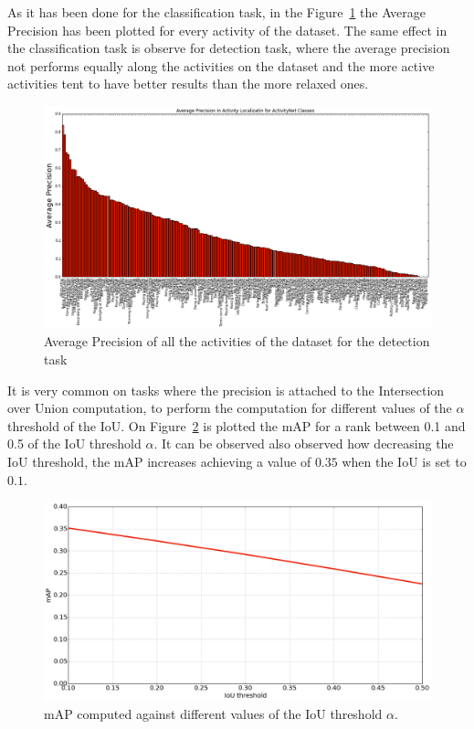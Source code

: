 As it has been done for the classification task, in the Figure~\ref{fig:ap_by_activity_classification} the Average Precision has been plotted for every activity of the dataset. The same effect in the classification task is observe for detection task, where the average precision not performs equally along the activities on the dataset and the more active activities tent to have better results than the more relaxed ones.

\begin{figure}[ht]
\begin{center}
\includegraphics[width=0.8\linewidth]{img/results/ap_by_activity_detection}
\end{center}
\caption{Average Precision of all the activities of the dataset for the detection task}
\label{fig:ap_by_activity_classification}
\end{figure}

It is very common on tasks where the precision is attached to the Intersection over Union computation, to perform the computation for different values of the $\alpha$ threshold of the IoU. On Figure~\ref{fig:map_vs_iou} is plotted the mAP for a rank between 0.1 and 0.5 of the IoU threshold $\alpha$. It can be observed also observed how decreasing the IoU threshold, the mAP increases achieving a value of $0.35$ when the IoU is set to $0.1$.

\begin{figure}[H]
\begin{center}
\includegraphics[width=0.8\linewidth]{img/results/map_vs_iou}
\end{center}
\caption{mAP computed against different values of the IoU threshold $\alpha$.}
\label{fig:map_vs_iou}
\end{figure}

